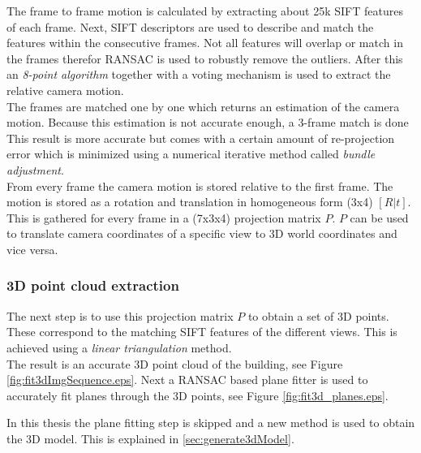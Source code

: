 The frame to frame motion is calculated by extracting about 25k SIFT features of
each frame.  Next, SIFT descriptors are used to describe and match the features
within the consecutive frames.  Not all features will overlap or match in the
frames therefor RANSAC is used to robustly remove the outliers.  After this an
\emph{8-point algorithm} together with a voting mechanism is used to extract the
relative camera motion.\\

The frames are matched one by one which returns an estimation of the camera
motion. Because this estimation is not accurate enough, a 3-frame match is done 
This result is more accurate but comes with a certain
amount of re-projection error which is minimized using a numerical
iterative method called \emph{bundle adjustment}.  \\

From every frame the camera motion is stored relative to the first frame.
The motion is stored as a rotation and translation in homogeneous
form (3x4) $[R|t]$. This is gathered for every frame in a (7x3x4) projection matrix $P$.
$P$ can be used to translate camera coordinates of a specific view 
 to 3D world coordinates and vice versa.

\subsubsection{3D point cloud extraction}
The next step is to use this projection matrix $P$ to obtain a set of 3D points.
These correspond to the matching SIFT features of the different views.  This
is achieved using a \emph{linear triangulation} method. \\
The result is an accurate 3D point cloud of the building, see Figure
\ref{fig:fit3dImgSequence.eps}.
Next a RANSAC based plane fitter is used to accurately fit planes through
the 3D points, see Figure \ref{fig:fit3d_planes.eps}.\\

In this thesis the plane fitting step is skipped and a new method is
used to obtain the 3D model. This is explained in \ref{sec:generate3dModel}.

% 
% 




